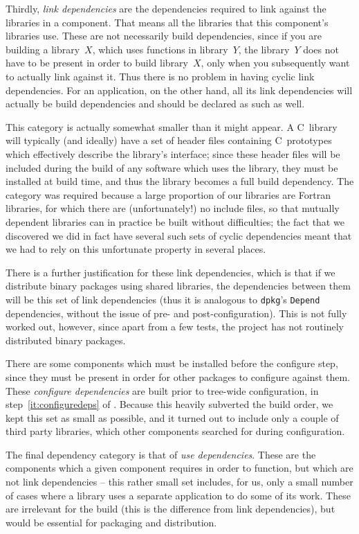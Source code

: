 \documentclass{speauth}
\begin{document}
Thirdly, \emph{link dependencies} are the dependencies required to
link against the libraries in a component. That means all the
libraries that this component's libraries use. These are not
necessarily build dependencies, since if you are building a
library~$X$, which uses functions in library~$Y$, the library~$Y$ does
not have to be present in order to build library~$X$, only when you
subsequently want to actually link against it.  Thus there is no
problem in having cyclic link dependencies.  For an application, on
the other hand, all its link dependencies will actually be build
dependencies and should be declared as such as well.

This category is actually somewhat smaller than it might appear.  A
C~library will typically (and ideally) have a set of header files
containing C~prototypes which effectively describe the library's
interface; since these header files will be included during the
build of any software which uses the library, they must be
installed at build time, and thus the library becomes a full build
dependency.  The category was required because a large proportion of
our libraries are Fortran libraries, for which there are
(unfortunately!) no include files, so that mutually dependent
libraries can in practice be built without difficulties; the fact that
we discovered we did in fact have several such sets of cyclic
dependencies meant that we had to rely on this unfortunate property in
several places.

There is a further justification for these link dependencies, which is
that if we distribute binary packages using shared libraries, the
dependencies between them will be this set of link dependencies (thus
it is analogous to \texttt{dpkg}'s \texttt{Depend} dependencies,
without the issue of pre- and post-configuration).  This is not fully
worked out, however, since apart from a few tests, the project has not
routinely distributed binary packages.

There are some components which must be installed before the configure
step, since they must be present in order for other packages to
configure against them.  These \emph{configure dependencies} are built
prior to tree-wide configuration, in step~\ref{it:configuredeps} of
.  Because this heavily subverted the build order,
we kept this set as small as possible, and it turned out to include
only a couple of third party libraries, which other components
searched for during configuration.

The final dependency category is that of \emph{use dependencies}.
These are the components which a given component requires in order to
function, but which are not link dependencies -- this rather small set
includes, for us, only a small number of cases where a library uses a
separate application to do some of its work.  These are irrelevant for
the build (this is the difference from link dependencies), but would
be essential for packaging and distribution.
\end{document}
